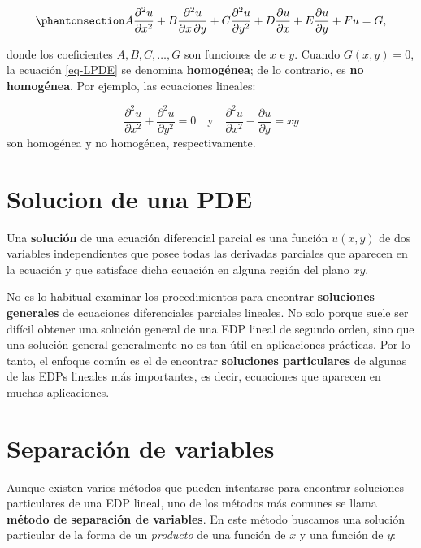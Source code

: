 \documentclass[
  spanish,
  us-letterpaper,
  DIV=11,
  numbers=noendperiod]{scrreprt}
\theoremstyle{definition}
\theoremstyle{plain}
\theoremstyle{remark}
\begin{document}
\begin{equation}\phantomsection\label{eq-LPDE}{
A \dfrac{\partial^2 u}{\partial x^2} + B \dfrac{\partial^2 u}{\partial x \, \partial y} + C \dfrac{\partial^2 u}{\partial y^2} + D \dfrac{\partial u}{\partial x} + E \dfrac{\partial u}{\partial y} + F u = G,
}\end{equation}

donde los coeficientes \(A, B, C, \dots, G\) son funciones de \(x\) e
\(y\). Cuando \(G(x, y) = 0\), la ecuación \ref{eq-LPDE} se denomina
\textbf{homogénea}; de lo contrario, es \textbf{no homogénea}. Por
ejemplo, las ecuaciones lineales:

\[
\dfrac{\partial^2 u}{\partial x^2} + \dfrac{\partial^2 u}{\partial y^2} = 0 \quad\text{y} \quad \dfrac{\partial^2 u}{\partial x^2} - \dfrac{\partial u}{\partial y} = x y
\] son homogénea y no homogénea, respectivamente.

\section{Solucion de una PDE}\label{solucion-de-una-pde}

Una \textbf{solución} de una ecuación diferencial parcial es una función
\(u(x, y)\) de dos variables independientes que posee todas las
derivadas parciales que aparecen en la ecuación y que satisface dicha
ecuación en alguna región del plano \(xy\).

No es lo habitual examinar los procedimientos para encontrar
\textbf{soluciones generales} de ecuaciones diferenciales parciales
lineales. No solo porque suele ser difícil obtener una solución general
de una EDP lineal de segundo orden, sino que una solución general
generalmente no es tan útil en aplicaciones prácticas. Por lo tanto, el
enfoque común es el de encontrar \textbf{soluciones particulares} de
algunas de las EDPs lineales más importantes, es decir, ecuaciones que
aparecen en muchas aplicaciones.

\section{Separación de variables}\label{separaciuxf3n-de-variables}

Aunque existen varios métodos que pueden intentarse para encontrar
soluciones particulares de una EDP lineal, uno de los métodos más
comunes se llama \textbf{método de separación de variables}. En este
método buscamos una solución particular de la forma de un
\emph{producto} de una función de \(x\) y una función de \(y\):
\end{document}
